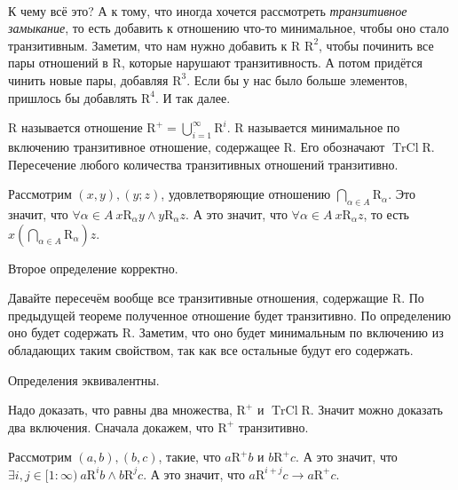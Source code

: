\documentclass{article}
\begin{document}
\begin{itemize}
\begin{Comment}
\\
            К чему всё это? А к тому, что иногда хочется рассмотреть \textit{транзитивное замыкание}, то есть добавить к отношению что-то минимальное, чтобы оно стало транзитивным. Заметим, что нам нужно добавить к $\mathrm R$ $\mathrm R^2$, чтобы починить все пары отношений в $\mathrm R$, которые нарушают транзитивность. А потом придётся чинить новые пары, добавляя $\mathrm R^3$. Если бы у нас было больше элементов, пришлось бы добавлять $\mathrm R^4$. И так далее.
        \end{Comment}
        \dfn {} $\mathrm R$ называется отношение $\mathrm R^+=\bigcup\limits_{i=1}^\infty\mathrm R^i$.
        \dfn {} $\mathrm R$ называется минимальное по включению транзитивное отношение, содержащее $\mathrm R$. Его обозначают $\operatorname{TrCl}\mathrm R$.
        \thm Пересечение любого количества транзитивных отношений транзитивно.
        \begin{Proof}
            Рассмотрим $(x,y),(y;z)$, удовлетворяющие отношению $\bigcap\limits_{\alpha\in A}\mathrm R_\alpha$. Это значит, что $\forall\alpha\in A~x\mathrm R_\alpha y\land y\mathrm R_\alpha z$. А это значит, что $\forall\alpha\in A~x\mathrm R_\alpha z$, то есть $x\left(\bigcap\limits_{\alpha\in A}\mathrm R_\alpha\right)z$.
        \end{Proof}
        \thm Второе определение корректно.
        \begin{Proof}
            Давайте пересечём вообще все транзитивные отношения, содержащие $\mathrm R$. По предыдущей теореме полученное отношение будет транзитивно. По определению оно будет содержать $\mathrm R$. Заметим, что оно будет минимальным по включению из обладающих таким свойством, так как все остальные будут его содержать.
        \end{Proof}
        \thm Определения эквивалентны.
        \begin{Proof}
            Надо доказать, что равны два множества, $\mathrm R^+$ и $\operatorname{TrCl}\mathrm R$. Значит можно доказать два включения. Сначала докажем, что $\mathrm R^+$ транзитивно.
            \begin{Proof}
                Рассмотрим $(a,b),(b,c)$, такие, что $a\mathrm R^+b$ и $b\mathrm R^+c$. А это значит, что $\exists i,j\in[1:\infty)~a\mathrm R^ib\land b\mathrm R^jc$. А это значит, что $a\mathrm R^{i+j}c\rightarrow a\mathrm R^+c$.

\end{Proof}
\end{Proof}
\end{itemize}
\end{document}
